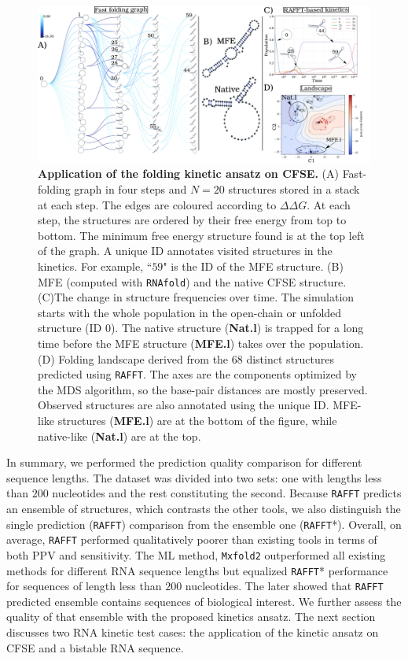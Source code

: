 \begin{figure}[t!]
	\centering
	\includegraphics[width=1.\linewidth]{../res/images/rafft/test_case.png}
	\caption{\label{test_case}\textbf{Application of the folding kinetic ansatz on \ac{CFSE}.}  (A) Fast-folding graph in four steps and $N=20$ structures stored in a stack at each step. The edges are coloured according to \(\Delta \Delta G\). At each step, the structures are ordered by their free energy from top to bottom. The minimum free energy structure found is at the top left of the graph. A unique ID annotates visited structures in the kinetics. For example, ``$59$" is the ID of the \ac{MFE} structure. (B) \ac{MFE} (computed with \texttt{RNAfold}) and the native \ac{CFSE} structure. (C)The change in structure frequencies over time. The simulation starts with the whole population in the open-chain or unfolded structure (ID 0). The native structure (\textbf{Nat.l}) is trapped for a long time before the \ac{MFE} structure (\textbf{MFE.l}) takes over the population. (D) Folding landscape derived from the $68$ distinct structures predicted using \texttt{RAFFT}. The axes are the components optimized by the MDS algorithm, so the base-pair distances are mostly preserved. Observed structures are also annotated using the unique ID. \ac{MFE}-like structures (\textbf{MFE.l}) are at the bottom of the figure, while native-like (\textbf{Nat.l}) are at the top.}
\end{figure}

In summary, we performed the prediction quality comparison for different sequence lengths. The dataset was divided into two sets: one with lengths less than $200$ nucleotides and the rest constituting the second. 
Because \texttt{RAFFT} predicts an ensemble of structures, which contrasts the other tools, we also distinguish the single prediction (\texttt{RAFFT}) comparison from the ensemble one (\texttt{RAFFT}*). Overall, on average, \texttt{RAFFT} performed qualitatively poorer than existing tools in terms of both \ac{PPV} and sensitivity. The \ac{ML} method, \texttt{Mxfold2} outperformed all existing methods for different \ac{RNA} sequence lengths but equalized \texttt{RAFFT}* performance  for sequences of length less than $200$ nucleotides. The later showed that \texttt{RAFFT} predicted ensemble contains sequences of biological interest. We further assess the quality of that ensemble with the proposed kinetics ansatz. The next section discusses two \ac{RNA} kinetic test cases: the application of the kinetic ansatz on \ac{CFSE} and a bistable \ac{RNA} sequence. 
